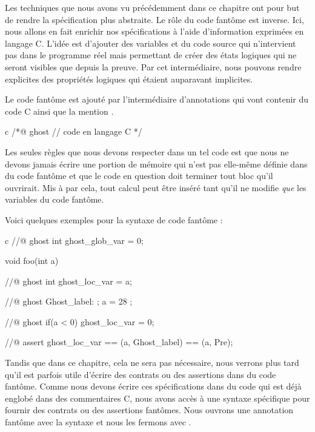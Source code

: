 Les techniques que nous avons vu précédemment dans ce chapitre ont pour but de
rendre la spécification plus abstraite. Le rôle du code fantôme est inverse. Ici,
nous allons en fait enrichir nos spécifications à l'aide d'information exprimées
en langage C. L'idée est d'ajouter des variables et du code source qui
n'intervient pas dans le programme réel mais permettant de créer des états
logiques qui ne seront visibles que depuis la preuve. Par cet intermédiaire,
nous pouvons rendre explicites des propriétés logiques qui étaient auparavant
implicites.




Le code fantôme est ajouté par l'intermédiaire d'annotations qui vont contenir
du code C ainsi que la mention .



\begin{CodeBlock}{c}
/*@
  ghost
  // code en langage C
*/
\end{CodeBlock}



Les seules règles que nous devons respecter dans un tel code est que nous ne
devons jamais écrire une portion de mémoire qui n'est pas elle-même définie dans
du code fantôme et que le code en question doit terminer tout bloc qu'il ouvrirait.
Mis à par cela, tout calcul peut être inséré tant qu’il ne modifie \textit{que} les variables
du code fantôme.



Voici quelques exemples pour la syntaxe de code fantôme :



\begin{CodeBlock}{c}
//@ ghost int ghost_glob_var = 0;

void foo(int a){
  //@ ghost int ghost_loc_var = a;

  //@ ghost Ghost_label: ;
  a = 28 ;

  //@ ghost if(a < 0){ ghost_loc_var = 0; }

  //@ assert ghost_loc_var == \at(a, Ghost_label) == \at(a, Pre);
}
\end{CodeBlock}


Tandis que dans ce chapitre, cela ne sera pas nécessaire, nous verrons plus tard
qu'il est parfois utile d'écrire des contrats ou des assertions dans du code
fantôme. Comme nous devons écrire ces spécifications dans du code qui est
déjà englobé dans des commentaires C, nous avons accès à une syntaxe spécifique
pour fournir des contrats ou des assertions fantômes. Nous ouvrons une annotation
fantôme avec la syntaxe  et nous les fermons avec .


